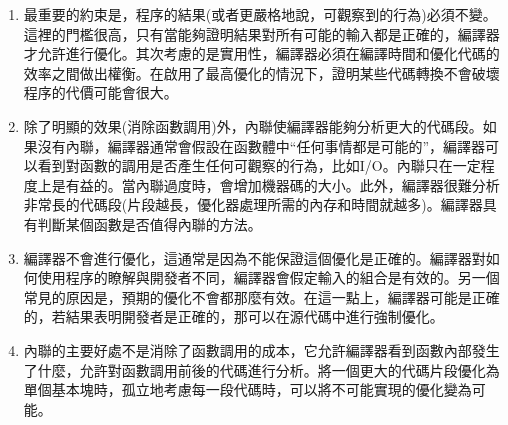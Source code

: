 \begin{enumerate}
\item 
最重要的約束是，程序的結果(或者更嚴格地說，可觀察到的行為)必須不變。這裡的門檻很高，只有當能夠證明結果對所有可能的輸入都是正確的，編譯器才允許進行優化。其次考慮的是實用性，編譯器必須在編譯時間和優化代碼的效率之間做出權衡。在啟用了最高優化的情況下，證明某些代碼轉換不會破壞程序的代價可能會很大。 

\item 
除了明顯的效果(消除函數調用)外，內聯使編譯器能夠分析更大的代碼段。如果沒有內聯，編譯器通常會假設在函數體中“任何事情都是可能的”，編譯器可以看到對函數的調用是否產生任何可觀察的行為，比如I/O。內聯只在一定程度上是有益的。當內聯過度時，會增加機器碼的大小。此外，編譯器很難分析非常長的代碼段(片段越長，優化器處理所需的內存和時間就越多)。編譯器具有判斷某個函數是否值得內聯的方法。

\item 
編譯器不會進行優化，這通常是因為不能保證這個優化是正確的。編譯器對如何使用程序的瞭解與開發者不同，編譯器會假定輸入的組合是有效的。另一個常見的原因是，預期的優化不會都那麼有效。在這一點上，編譯器可能是正確的，若結果表明開發者是正確的，那可以在源代碼中進行強制優化。

\item
內聯的主要好處不是消除了函數調用的成本，它允許編譯器看到函數內部發生了什麼，允許對函數調用前後的代碼進行分析。將一個更大的代碼片段優化為單個基本塊時，孤立地考慮每一段代碼時，可以將不可能實現的優化變為可能。

\end{enumerate}